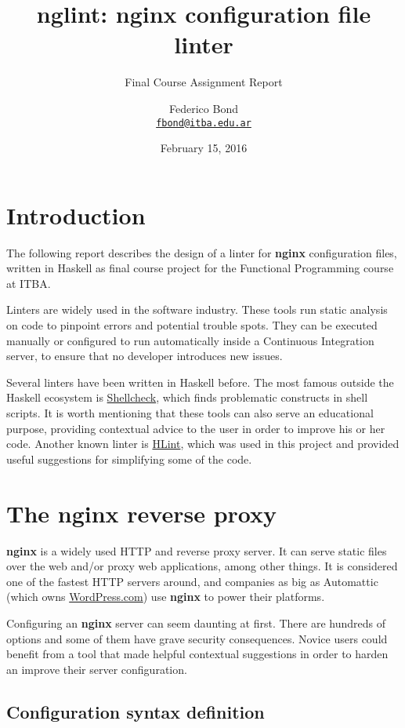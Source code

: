 \documentclass[]{article}
\title{nglint: nginx configuration file linter}
\subtitle{Final Course Assignment Report}
\author{Federico Bond \\
\texttt{\href{mailto:fbond@itba.edu.ar}{fbond@itba.edu.ar}} }
\date{February 15, 2016}
\begin{document}
\maketitle

\section{Introduction}\label{introduction}

The following report describes the design of a linter for \textbf{nginx}
configuration files, written in Haskell as final course project for the
Functional Programming course at ITBA.

Linters are widely used in the software industry. These tools run static
analysis on code to pinpoint errors and potential trouble spots. They
can be executed manually or configured to run automatically inside a
Continuous Integration server, to ensure that no developer introduces new
issues.

Several linters have been written in Haskell before. The most famous
outside the Haskell ecosystem is
\href{http://www.shellcheck.net/}{Shellcheck}, which finds
problematic constructs in shell scripts. It is worth mentioning that these
tools can also serve an educational purpose, providing contextual advice
to the user in order to improve his or her code. Another known linter is
\href{https://github.com/ndmitchell/hlint}{HLint}, which was used in
this project and provided useful suggestions for simplifying some of the code.

\section{The \textbf{nginx} reverse proxy}\label{nginx}

\textbf{nginx} is a widely used HTTP and reverse proxy server. It can
serve static files over the web and/or proxy web applications, among
other things. It is considered one of the fastest HTTP servers around, and
companies as big as Automattic (which owns \href{https://wordpress.com/}{WordPress.com})
use \textbf{nginx} to power their platforms.

Configuring an \textbf{nginx} server can seem daunting at first. There
are hundreds of options and some of them have grave security
consequences. Novice users could benefit from a tool that made helpful
contextual suggestions in order to harden an improve their server configuration.

\subsection{Configuration syntax definition}\label{syntax-definition}
\end{document}
